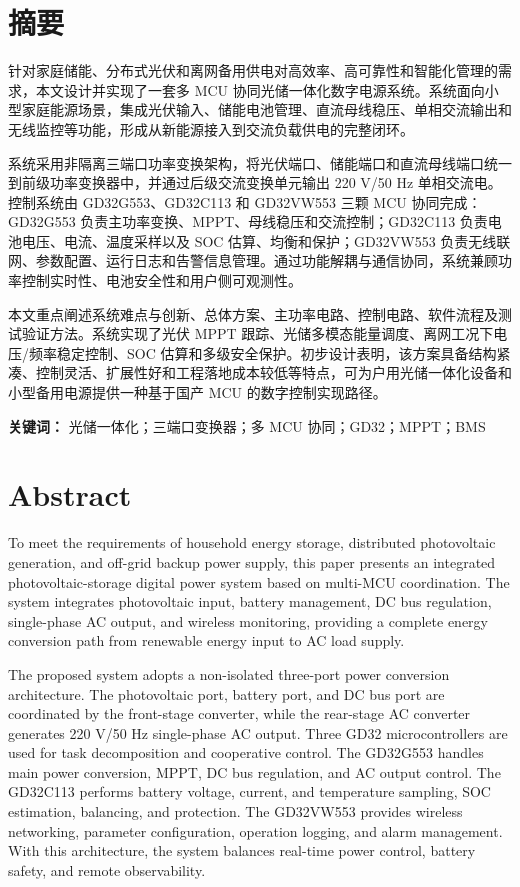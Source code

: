 ﻿%
\clearpage
\section*{摘要}

针对家庭储能、分布式光伏和离网备用供电对高效率、高可靠性和智能化管理的需求，本文设计并实现了一套多 MCU 协同光储一体化数字电源系统。系统面向小型家庭能源场景，集成光伏输入、储能电池管理、直流母线稳压、单相交流输出和无线监控等功能，形成从新能源接入到交流负载供电的完整闭环。

系统采用非隔离三端口功率变换架构，将光伏端口、储能端口和直流母线端口统一到前级功率变换器中，并通过后级交流变换单元输出 220 V/50 Hz 单相交流电。控制系统由 GD32G553、GD32C113 和 GD32VW553 三颗 MCU 协同完成：GD32G553 负责主功率变换、MPPT、母线稳压和交流控制；GD32C113 负责电池电压、电流、温度采样以及 SOC 估算、均衡和保护；GD32VW553 负责无线联网、参数配置、运行日志和告警信息管理。通过功能解耦与通信协同，系统兼顾功率控制实时性、电池安全性和用户侧可观测性。

本文重点阐述系统难点与创新、总体方案、主功率电路、控制电路、软件流程及测试验证方法。系统实现了光伏 MPPT 跟踪、光储多模态能量调度、离网工况下电压/频率稳定控制、SOC 估算和多级安全保护。初步设计表明，该方案具备结构紧凑、控制灵活、扩展性好和工程落地成本较低等特点，可为户用光储一体化设备和小型备用电源提供一种基于国产 MCU 的数字控制实现路径。

\vspace{1em}
\noindent\textbf{关键词：} 光储一体化；三端口变换器；多 MCU 协同；GD32；MPPT；BMS

\clearpage
\section*{Abstract}

To meet the requirements of household energy storage, distributed photovoltaic generation, and off-grid backup power supply, this paper presents an integrated photovoltaic-storage digital power system based on multi-MCU coordination. The system integrates photovoltaic input, battery management, DC bus regulation, single-phase AC output, and wireless monitoring, providing a complete energy conversion path from renewable energy input to AC load supply.

The proposed system adopts a non-isolated three-port power conversion architecture. The photovoltaic port, battery port, and DC bus port are coordinated by the front-stage converter, while the rear-stage AC converter generates 220 V/50 Hz single-phase AC output. Three GD32 microcontrollers are used for task decomposition and cooperative control. The GD32G553 handles main power conversion, MPPT, DC bus regulation, and AC output control. The GD32C113 performs battery voltage, current, and temperature sampling, SOC estimation, balancing, and protection. The GD32VW553 provides wireless networking, parameter configuration, operation logging, and alarm management. With this architecture, the system balances real-time power control, battery safety, and remote observability.


